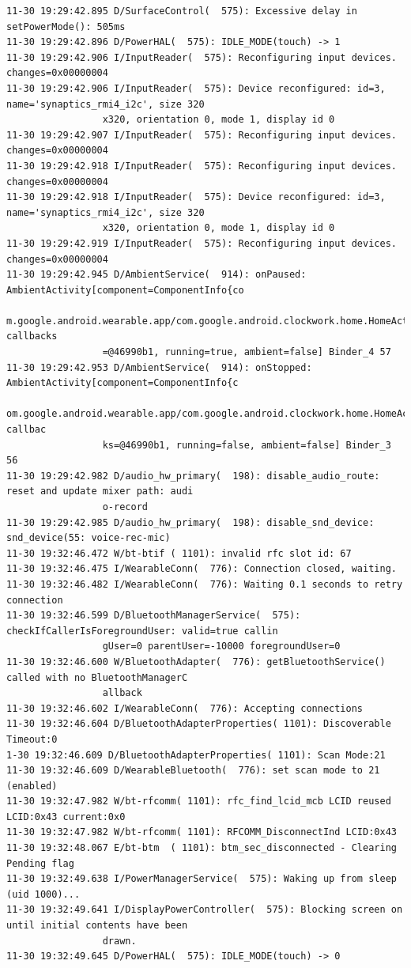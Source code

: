 \documentclass[a4paper,11pt,dvips]{article}
\begin{document}
\begin{verbatim}
11-30 19:29:42.895 D/SurfaceControl(  575): Excessive delay in setPowerMode(): 505ms
11-30 19:29:42.896 D/PowerHAL(  575): IDLE_MODE(touch) -> 1
11-30 19:29:42.906 I/InputReader(  575): Reconfiguring input devices.  changes=0x00000004
11-30 19:29:42.906 I/InputReader(  575): Device reconfigured: id=3, name='synaptics_rmi4_i2c', size 320
                 x320, orientation 0, mode 1, display id 0
11-30 19:29:42.907 I/InputReader(  575): Reconfiguring input devices.  changes=0x00000004
11-30 19:29:42.918 I/InputReader(  575): Reconfiguring input devices.  changes=0x00000004
11-30 19:29:42.918 I/InputReader(  575): Device reconfigured: id=3, name='synaptics_rmi4_i2c', size 320
                 x320, orientation 0, mode 1, display id 0
11-30 19:29:42.919 I/InputReader(  575): Reconfiguring input devices.  changes=0x00000004
11-30 19:29:42.945 D/AmbientService(  914): onPaused: AmbientActivity[component=ComponentInfo{co
                 m.google.android.wearable.app/com.google.android.clockwork.home.HomeActivity}, callbacks
                 =@46990b1, running=true, ambient=false] Binder_4 57
11-30 19:29:42.953 D/AmbientService(  914): onStopped: AmbientActivity[component=ComponentInfo{c
                 om.google.android.wearable.app/com.google.android.clockwork.home.HomeActivity}, callbac
                 ks=@46990b1, running=false, ambient=false] Binder_3 56
11-30 19:29:42.982 D/audio_hw_primary(  198): disable_audio_route: reset and update mixer path: audi
                 o-record
11-30 19:29:42.985 D/audio_hw_primary(  198): disable_snd_device: snd_device(55: voice-rec-mic)
11-30 19:32:46.472 W/bt-btif ( 1101): invalid rfc slot id: 67
11-30 19:32:46.475 I/WearableConn(  776): Connection closed, waiting.
11-30 19:32:46.482 I/WearableConn(  776): Waiting 0.1 seconds to retry connection
11-30 19:32:46.599 D/BluetoothManagerService(  575): checkIfCallerIsForegroundUser: valid=true callin
                 gUser=0 parentUser=-10000 foregroundUser=0
11-30 19:32:46.600 W/BluetoothAdapter(  776): getBluetoothService() called with no BluetoothManagerC
                 allback
11-30 19:32:46.602 I/WearableConn(  776): Accepting connections
11-30 19:32:46.604 D/BluetoothAdapterProperties( 1101): Discoverable Timeout:0
1-30 19:32:46.609 D/BluetoothAdapterProperties( 1101): Scan Mode:21
11-30 19:32:46.609 D/WearableBluetooth(  776): set scan mode to 21 (enabled)
11-30 19:32:47.982 W/bt-rfcomm( 1101): rfc_find_lcid_mcb LCID reused LCID:0x43 current:0x0
11-30 19:32:47.982 W/bt-rfcomm( 1101): RFCOMM_DisconnectInd LCID:0x43
11-30 19:32:48.067 E/bt-btm  ( 1101): btm_sec_disconnected - Clearing Pending flag
11-30 19:32:49.638 I/PowerManagerService(  575): Waking up from sleep (uid 1000)...
11-30 19:32:49.641 I/DisplayPowerController(  575): Blocking screen on until initial contents have been
                 drawn.
11-30 19:32:49.645 D/PowerHAL(  575): IDLE_MODE(touch) -> 0
\end{verbatim}
\normalsize
\end{document}
